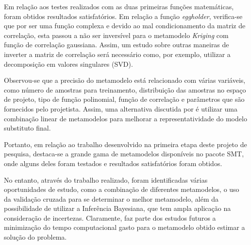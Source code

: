 


Em relação aos testes realizados com as duas primeiras funções matemáticas, foram obtidos resultados satisfatórios. Em relação a função \textit{eggholder}, verifica-se que por ser uma função complexa e devido ao mal condicionamento da matriz de correlação, esta passou a não ser inversível para o metamodelo {\it Kriging} com função de correlação gaussiana. Assim, um estudo sobre outras maneiras de inverter a matriz de correlação será necessário como, por exemplo, utilizar a decomposição em valores singulares (SVD).

Observou-se que a precisão do metamodelo está relacionado com várias variáveis, como número de amostras para treinamento, distribuição das amostras no espaço de projeto, tipo de função polinomial, função de correlação e parâmetros que são fornecidos pelo projetista. Assim, uma alternativa discutida por  é utilizar uma combinação linear de metamodelos para melhorar a representatividade do modelo substituto final. 

Portanto, em relação ao trabalho desenvolvido na primeira etapa deste projeto de pesquisa, destaca-se a grande gama de metamodelos disponíveis no pacote SMT, onde alguns deles foram testados e resultados satisfatórios foram obtidos.

No entanto, através do trabalho realizado, foram identificadas várias oportunidades de estudo, como a combinação de diferentes metamodelos, o uso da validação cruzada para se determinar o melhor metamodelo, além da possibilidade de utilizar a Inferência Bayesiana, que tem ampla aplicação na consideração de incertezas. Claramente, faz parte dos estudos futuros a minimização do tempo computacional gasto para o metamodelo obtido estimar a solução do problema.   

